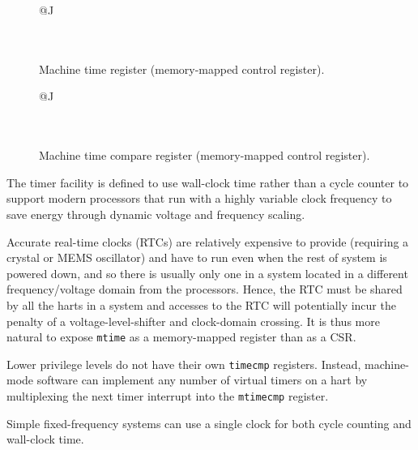 \begin{figure}[h!]
	{\footnotesize
		\begin{center}
			\begin{tabular}{@{}J}
				 \\
				\hline
				 \\
				 \\
			\end{tabular}
		\end{center}
	}
	\vspace{-0.1in}
	\caption{Machine time register (memory-mapped control register).}
\end{figure}

\begin{figure}[h!]
	{\footnotesize
		\begin{center}
			\begin{tabular}{@{}J}
				\instbitrange{63}{0} \\
				\hline
				\multicolumn{1}{|c|}{\tt mtimecmp} \\
				\hline
				64 \\
			\end{tabular}
		\end{center}
	}
	\vspace{-0.1in}
	\caption{Machine time compare register (memory-mapped control register).}
\end{figure}

\begin{commentary}
	The timer facility is defined to use wall-clock time rather than a
	cycle counter to support modern processors that run with a highly
	variable clock frequency to save energy through dynamic voltage and
	frequency scaling.

	Accurate real-time clocks (RTCs) are relatively expensive to provide
	(requiring a crystal or MEMS oscillator) and have to run even when the
	rest of system is powered down, and so there is usually only one in a
	system located in a different frequency/voltage domain from the
	processors.  Hence, the RTC must be shared by all the harts in a
	system and accesses to the RTC will potentially incur the penalty of a
	voltage-level-shifter and clock-domain crossing.  It is thus more
	natural to expose {\tt mtime} as a memory-mapped register than as a CSR.

	Lower privilege levels do not have their own {\tt timecmp} registers.
	Instead, machine-mode software can implement any number of virtual timers on
	a hart by multiplexing the next timer interrupt into the {\tt mtimecmp}
	register.

	Simple fixed-frequency systems can use a single clock for both cycle
	counting and wall-clock time.
\end{commentary}

